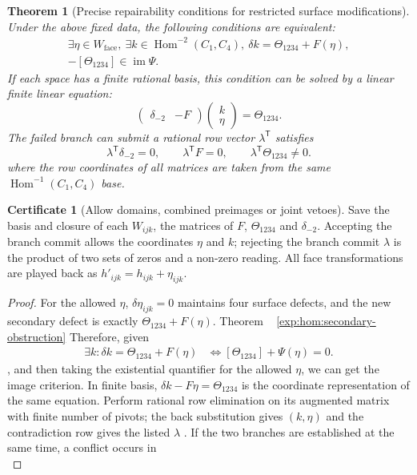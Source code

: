 \documentclass[12pt,a4paper,openany,notitlepage]{report}
\theoremstyle{plain}
\newtheorem{theorem}{Theorem}[chapter]
\theoremstyle{definition}
\newtheorem*{certificate}{Certificate}
\theoremstyle{remark}
\begin{document}
\begin{CJK*}
\begin{theorem}
[Precise repairability conditions for restricted surface modifications]\label{exp:hom:restricted-secondary}
Under the above fixed data, the following conditions are equivalent: \[
 \begin{gathered}
 \exists\eta\in W_{\mathrm{face}},\
 \exists k\in\operatorname{Hom}^{-2}(C_1,C_4),\
 \delta k=\Theta_{1234}+F(\eta),\\
 -[\Theta_{1234}]\in\operatorname{im}\Psi.
 \end{gathered}
\] If each space has a finite rational basis, this condition can be solved by a linear finite linear equation: \[
 \begin{pmatrix}\delta_{-2}&-F\end{pmatrix}
 \begin{pmatrix}k\\ \eta\end{pmatrix}
 =\Theta_{1234}.
\] The failed branch can submit a rational row vector $\lambda^{\mathsf T}$ satisfies \[
 \lambda^{\mathsf T}\delta_{-2}=0,\qquad
 \lambda^{\mathsf T}F=0,\qquad
 \lambda^{\mathsf T}\Theta_{1234}\ne0.
\] where the row coordinates of all matrices are taken from the same $\operatorname{Hom}^{-1}(C_1,C_4)$ base.\end{theorem}
\begin{certificate}
[Allow domains, combined preimages or joint vetoes]Save the basis and closure of each $W_{ijk}$, the matrices of $F$, $\Theta_{1234}$ and $\delta_{-2}$. Accepting the branch commit allows the coordinates $\eta$ and $k$; rejecting the branch commit $\lambda$ is the product of two sets of zeros and a non-zero reading. All face transformations are played back as $h'_{ijk}=h_{ijk}+\eta_{ijk}$.\end{certificate}
\begin{proof}
For the allowed $\eta$, $\delta\eta_{ijk}=0$ maintains four surface defects, and the new secondary defect is exactly $\Theta_{1234}+F(\eta)$. Theorem ~ \ref{exp:hom:secondary-obstruction} Therefore, given \[
 \begin{aligned}
 \exists k:\delta k=\Theta_{1234}+F(\eta)
 &\Longleftrightarrow
 [\Theta_{1234}]+\Psi(\eta)=0.
 \end{aligned}
\], and then taking the existential quantifier for the allowed $\eta$, we can get the image criterion. In finite basis, $\delta k-F\eta=\Theta_{1234}$ is the coordinate representation of the same equation. Perform rational row elimination on its augmented matrix with finite number of pivots; the back substitution gives $(k,\eta)$ and the contradiction row gives the listed $\lambda$ . If the two branches are established at the same time, a conflict occurs in \[
\]
\end{proof}
\end{CJK*}
\end{document}
